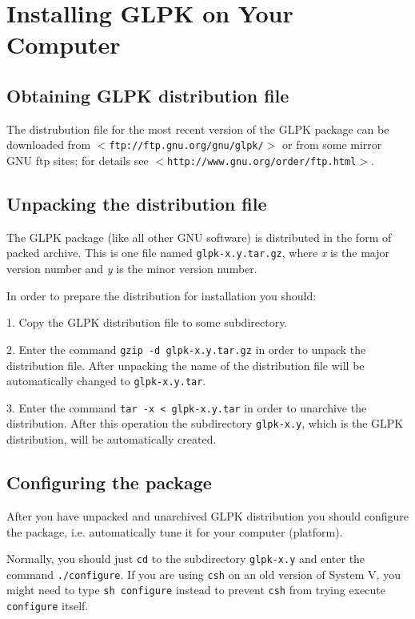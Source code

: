 
\chapter{Installing GLPK on Your Computer}
\label{install}

\section{Obtaining GLPK distribution file}

The distrubution file for the most recent version of the GLPK package
can be downloaded from $<$\verb|ftp://ftp.gnu.org/gnu/glpk/|$>$ or from
some mirror GNU ftp sites; for details see
$<$\verb|http://www.gnu.org/order/ftp.html|$>$.

\section{Unpacking the distribution file}

The GLPK package (like all other GNU software) is distributed in the
form of packed archive. This is one file named \verb|glpk-x.y.tar.gz|,
where {\it x} is the major version number and {\it y} is the minor
version number.

In order to prepare the distribution for installation you should:

1. Copy the GLPK distribution file to some subdirectory.

2. Enter the command \verb|gzip -d glpk-x.y.tar.gz| in order to unpack
the distribution file. After unpacking the name of the distribution file
will be automatically changed to \verb|glpk-x.y.tar|.

3. Enter the command \verb|tar -x < glpk-x.y.tar| in order to unarchive
the distribution. After this operation the subdirectory \verb|glpk-x.y|,
which is the GLPK distribution, will be automatically created.

\section{Configuring the package}

After you have unpacked and unarchived GLPK distribution you should
configure the package, i.e. automatically tune it for your computer
(platform).

Normally, you should just \verb|cd| to the subdirectory
\verb|glpk-x.y| and enter the command \verb|./configure|. If you are
using \verb|csh| on an old version of System V, you might need to type
\verb|sh configure| instead to prevent \verb|csh| from trying execute
\verb|configure| itself.


